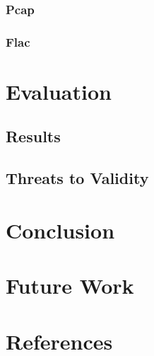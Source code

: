 \documentclass[a4paper]{scrartcl}
\begin{document}
\subsubsection{Pcap}
\subsubsection{Flac}
\section{Evaluation}
\subsection{Results}
\subsection{Threats to Validity}
\section{Conclusion}
\section{Future Work}
\newpage
\section*{References}
\renewcommand\refname{}


\newpage
\listoftodos[Notes]
\end{document}
